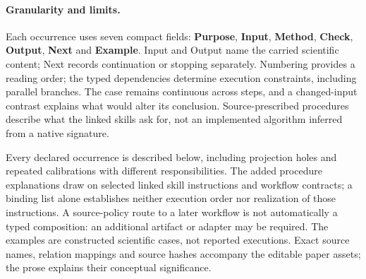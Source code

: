 \paragraph{Granularity and limits.}
Each occurrence uses seven compact fields: \textbf{Purpose}, \textbf{Input},
\textbf{Method}, \textbf{Check}, \textbf{Output}, \textbf{Next} and
\textbf{Example}. Input and Output name the carried scientific content;
Next records continuation or stopping separately. Numbering provides a reading order;
the typed dependencies determine execution constraints, including parallel branches.
The case remains continuous across steps, and a changed-input contrast explains
what would alter its conclusion. Source-prescribed procedures describe what the
linked skills ask for, not an implemented algorithm inferred from a native signature.

Every declared occurrence is described below, including projection holes and repeated calibrations with different responsibilities. The added procedure explanations draw on selected linked skill instructions and workflow contracts; a binding list alone establishes neither execution order nor realization of those instructions. A source-policy route to a later workflow is not automatically a typed composition: an additional artifact or adapter may be required. The examples are constructed scientific cases, not reported executions. Exact source names, relation mappings and source hashes accompany the editable paper assets; the prose explains their conceptual significance.




